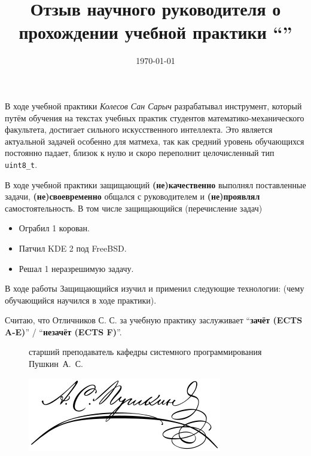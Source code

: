 \documentclass{article}
\title{Отзыв научного руководителя о прохождении  учебной практики \enquote{\worktitle}}
\date{\today}
\begin{document}
\maketitle
В ходе  учебной  практики \textit{Колесов Сан Сарыч} разрабатывал инструмент,
который путём обучения на текстах учебных практик студентов математико-механического факультета,
достигает сильного искусственного интеллекта.
Это является актуальной задачей особенно для матмеха, так как средний уровень обучающихся постоянно падает, близок к нулю и скоро переполнит целочисленный тип \verb=uint8_t=.

В ходе учебной практики защищающий \textbf{(не)качественно} выполнял поставленные задачи,
\textbf{(не)своевременно} общался с руководителем и
\textbf{(не)проявлял} самостоятельность.
В том числе защищающийся {\small (перечисление задач)}
\begin{itemize}
\item Ограбил  1 корован.
\item Патчил KDE 2 под FreeBSD.
\item Решал 1 неразрешимую задачу.
\end{itemize}

\noindent В ходе работы Защищающийся изучил и применил следующие технологии: (чему обучающийся научился в ходе практики).

Считаю, что Отличников С. С. за учебную практику заслуживает \enquote{\textbf{зачёт (ECTS A-E)}} / \enquote{\textbf{незачёт (ECTS F)}}.

\vspace{1cm}
\begin{figure}[!htb]
    \centering
    \begin{minipage}{.4\textwidth}
        \centering
     старший преподаватель кафедры системного программирования Пушкин~А.~С.
    \end{minipage}%
    \begin{minipage}{0.58\textwidth}
    \begin{flushright}
     \includegraphics[width=.9\linewidth]{signature.png}\\
    \end{flushright}
    \end{minipage}
\end{figure}
\end{document}
